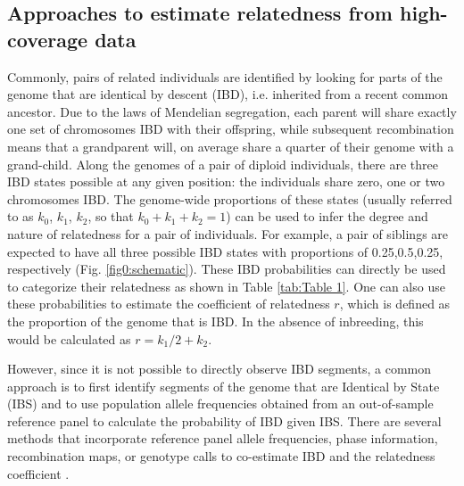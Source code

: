 \documentclass[12pt, letterpaper]{article}
\begin{document}
\subsection{Approaches to estimate relatedness from high-coverage data}

Commonly, pairs of related individuals are identified by looking for parts of the genome that are identical by descent (IBD), i.e. inherited from a recent common ancestor. Due to the laws of Mendelian segregation, each parent will share exactly one set of chromosomes IBD with their offspring, while subsequent recombination means that a grandparent will, on average share a quarter of their genome with a grand-child. Along the genomes of a pair of diploid individuals, there are three IBD states possible at any given position: the individuals share zero, one or two chromosomes IBD. The genome-wide proportions of these states (usually referred to as $k_0$, $k_1$, $k_2$, so that $k_0+k_1+k_2=1$) can be used to infer the degree and nature of relatedness for a pair of individuals. For example, a pair of siblings are expected to have all three possible IBD states with proportions of 0.25,0.5,0.25, respectively (Fig. \ref{fig0:schematic}). These IBD probabilities can directly be used to categorize their relatedness as shown in Table \ref{tab:Table 1}. One can also use these probabilities to estimate the coefficient of relatedness $r$, which is defined as the proportion of the genome that is IBD. In the absence of inbreeding, this would be calculated as $r= k_1/2 + k_2$.

However, since it is not possible to directly observe IBD segments, a common approach is to first identify segments of the genome that are Identical by State (IBS) and to use population allele frequencies obtained from an out-of-sample reference panel to calculate the probability of IBD given IBS. There are several methods that incorporate reference panel allele frequencies, phase information, recombination maps, or genotype calls to co-estimate IBD and the relatedness coefficient \cite{huff_maximum-likelihood_2011,li_relationship_2014,thornton_estimating_2012, boehnke_accurate_1997,lynch_estimation_1999, purcell_plink_2007,manichaikul_robust_2010,gusev_whole_2009,nyerki_optimized_2022,browning_fast_2011,li_accurate_2014}.
\end{document}
